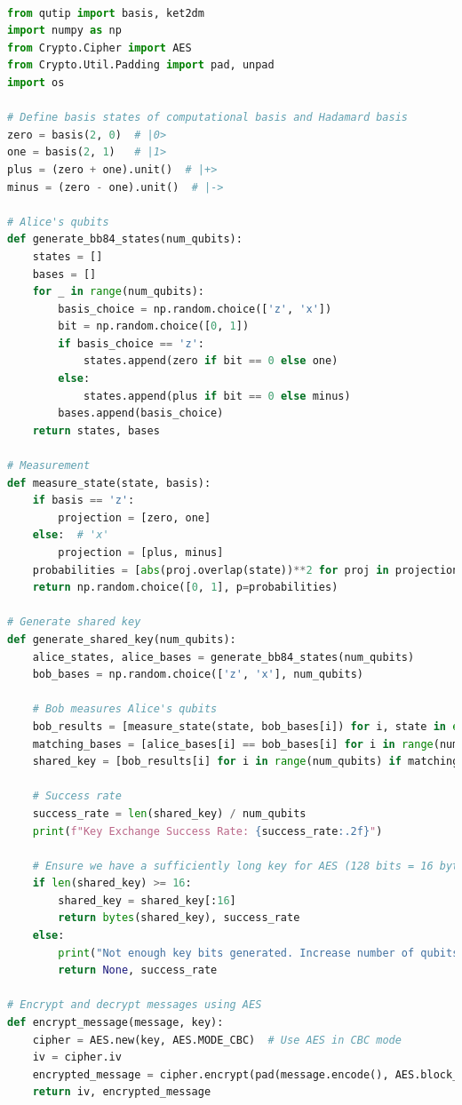 \documentclass[12pt]{ieeetj}
\begin{document}
\begin{lstlisting}[language=Python, caption= QKD-AES application, label=code:QKD]

from qutip import basis, ket2dm
import numpy as np
from Crypto.Cipher import AES
from Crypto.Util.Padding import pad, unpad
import os

# Define basis states of computational basis and Hadamard basis
zero = basis(2, 0)  # |0>
one = basis(2, 1)   # |1>
plus = (zero + one).unit()  # |+>
minus = (zero - one).unit()  # |->

# Alice's qubits
def generate_bb84_states(num_qubits):
    states = []
    bases = []
    for _ in range(num_qubits):
        basis_choice = np.random.choice(['z', 'x'])
        bit = np.random.choice([0, 1])
        if basis_choice == 'z':
            states.append(zero if bit == 0 else one)
        else:
            states.append(plus if bit == 0 else minus)
        bases.append(basis_choice)
    return states, bases

# Measurement
def measure_state(state, basis):
    if basis == 'z':
        projection = [zero, one]
    else:  # 'x'
        projection = [plus, minus]
    probabilities = [abs(proj.overlap(state))**2 for proj in projection]
    return np.random.choice([0, 1], p=probabilities)

# Generate shared key
def generate_shared_key(num_qubits):
    alice_states, alice_bases = generate_bb84_states(num_qubits)
    bob_bases = np.random.choice(['z', 'x'], num_qubits)

    # Bob measures Alice's qubits
    bob_results = [measure_state(state, bob_bases[i]) for i, state in enumerate(alice_states)]
    matching_bases = [alice_bases[i] == bob_bases[i] for i in range(num_qubits)]
    shared_key = [bob_results[i] for i in range(num_qubits) if matching_bases[i]]

    # Success rate
    success_rate = len(shared_key) / num_qubits
    print(f"Key Exchange Success Rate: {success_rate:.2f}")

    # Ensure we have a sufficiently long key for AES (128 bits = 16 bytes)
    if len(shared_key) >= 16:
        shared_key = shared_key[:16]
        return bytes(shared_key), success_rate
    else:
        print("Not enough key bits generated. Increase number of qubits.")
        return None, success_rate

# Encrypt and decrypt messages using AES
def encrypt_message(message, key):
    cipher = AES.new(key, AES.MODE_CBC)  # Use AES in CBC mode
    iv = cipher.iv
    encrypted_message = cipher.encrypt(pad(message.encode(), AES.block_size))
    return iv, encrypted_message


\end{lstlisting}
\end{document}
